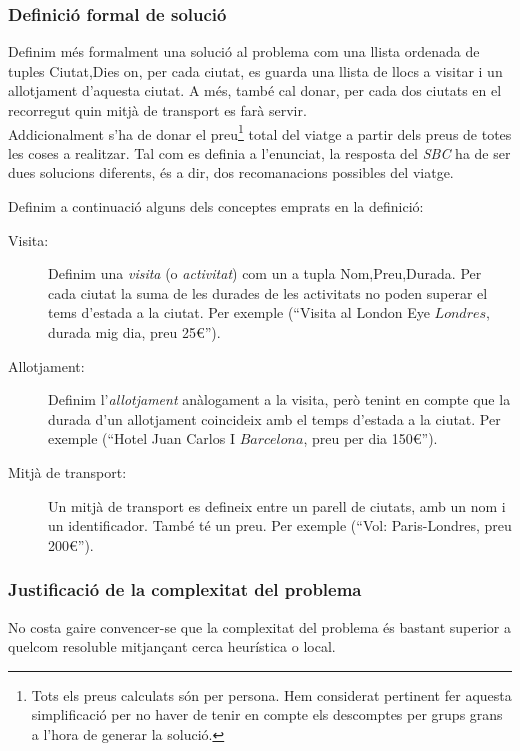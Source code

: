\documentclass[11pt,a4paper]{article}
\begin{document}
\subsubsection{Definició formal de solució}
Definim més formalment una solució al problema com una llista ordenada de tuples \big \langle Ciutat,Dies\big \rangle{} on, per cada ciutat, es guarda una llista de llocs a visitar i un allotjament d'aquesta ciutat. A més, també cal donar, per cada dos ciutats en el recorregut quin mitjà de transport es farà servir.\\
Addicionalment s'ha de donar el preu\footnote{Tots els preus calculats són per persona. Hem considerat pertinent fer aquesta simplificació per no haver de tenir en compte els descomptes per grups grans a l'hora de generar la solució.} total del viatge a partir dels preus de totes les coses a realitzar. Tal com es definia a l'enunciat, la resposta del \emph{SBC} ha de ser dues solucions diferents, és a dir, dos recomanacions possibles del viatge.

Definim a continuació alguns dels conceptes emprats en la definició:

\begin{description}
	\item[Visita:] Definim una \emph{visita} (o \emph{activitat}) com un a tupla \big \langle Nom,Preu,Durada\big \rangle{}. Per cada ciutat la suma de les durades de les activitats no poden superar el tems d'estada a la ciutat. Per exemple (``Visita al London Eye \(Londres\), durada mig dia, preu 25\euro'').
	\item[Allotjament:] Definim l'\emph{allotjament} anàlogament a la visita, però tenint en compte que la durada d'un allotjament coincideix amb el temps d'estada a la ciutat. Per exemple (``Hotel Juan Carlos I \(Barcelona\), preu per dia 150\euro'').
	\item[Mitjà de transport:] Un mitjà de transport es defineix entre un parell de ciutats, amb un nom i un identificador. També té un preu. Per exemple (``Vol: Paris-Londres, preu 200\euro'').
\end{description}

\subsubsection{Justificació de la complexitat del problema}
No costa gaire convencer-se que la complexitat del problema és bastant superior a quelcom resoluble mitjançant cerca heurística o local.
\end{document}
